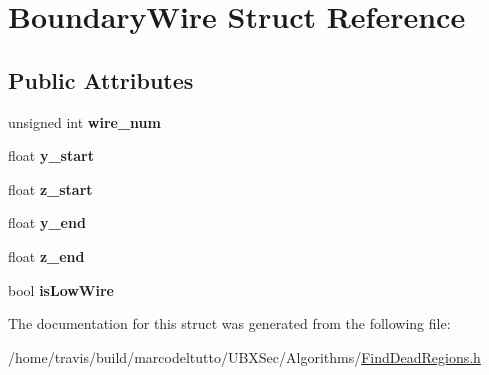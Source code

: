\hypertarget{structBoundaryWire}{\section{\-Boundary\-Wire \-Struct \-Reference}
\label{structBoundaryWire}
}
\subsection*{\-Public \-Attributes}
\begin{DoxyCompactItemize}
\item 
\hypertarget{structBoundaryWire_aea1c09c6f1af43423698dd4d9ca0b86f}{unsigned int {\bfseries wire\-\_\-num}}\label{structBoundaryWire_aea1c09c6f1af43423698dd4d9ca0b86f}

\item 
\hypertarget{structBoundaryWire_a6969e3a2ea00f7a7f10e7a2a6add17a0}{float {\bfseries y\-\_\-start}}\label{structBoundaryWire_a6969e3a2ea00f7a7f10e7a2a6add17a0}

\item 
\hypertarget{structBoundaryWire_ac18920460b74370ddfaca7aaf2089283}{float {\bfseries z\-\_\-start}}\label{structBoundaryWire_ac18920460b74370ddfaca7aaf2089283}

\item 
\hypertarget{structBoundaryWire_a280aaa480170ff5f75b551e00993dc41}{float {\bfseries y\-\_\-end}}\label{structBoundaryWire_a280aaa480170ff5f75b551e00993dc41}

\item 
\hypertarget{structBoundaryWire_a5b3e58ad04ba75fb7c77cdb50cea3686}{float {\bfseries z\-\_\-end}}\label{structBoundaryWire_a5b3e58ad04ba75fb7c77cdb50cea3686}

\item 
\hypertarget{structBoundaryWire_a8ad92872ad08d86d9047a96d36255090}{bool {\bfseries is\-Low\-Wire}}\label{structBoundaryWire_a8ad92872ad08d86d9047a96d36255090}

\end{DoxyCompactItemize}


\-The documentation for this struct was generated from the following file\-:\begin{DoxyCompactItemize}
\item 
/home/travis/build/marcodeltutto/\-U\-B\-X\-Sec/\-Algorithms/\hyperlink{FindDeadRegions_8h}{\-Find\-Dead\-Regions.\-h}\end{DoxyCompactItemize}
